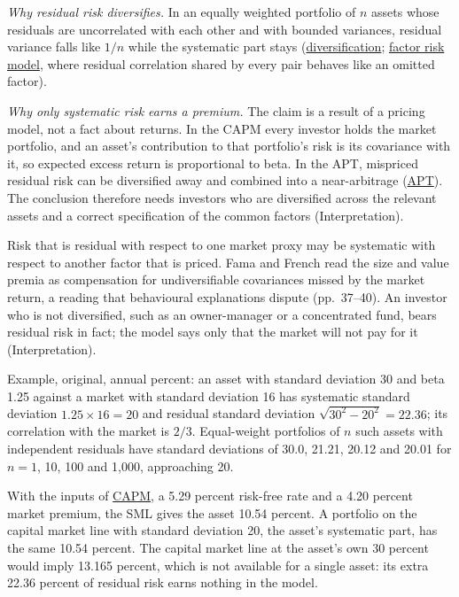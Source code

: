 \begin{qfmechanism}
 \emph{Why residual risk diversifies.} In an equally weighted portfolio of $n$ assets whose residuals are uncorrelated with each other and with bounded variances, residual variance falls like $1/n$ while the systematic part stays (\hyperref[mech:diversification-correlation]{diversification}; \hyperref[mod:factor-risk-model]{factor risk model}, where residual correlation shared by every pair behaves like an omitted factor).

\emph{Why only systematic risk earns a premium.} The claim is a result of a pricing model, not a fact about returns. In the CAPM every investor holds the market portfolio, and an asset's contribution to that portfolio's risk is its covariance with it, so expected excess return is proportional to beta. In the APT, mispriced residual risk can be diversified away and combined into a near-arbitrage (\hyperref[mod:multifactor-apt]{APT}). The conclusion therefore needs investors who are diversified across the relevant assets and a correct specification of the common factors (Interpretation).

Risk that is residual with respect to one market proxy may be systematic with respect to another factor that is priced. Fama and French read the size and value premia as compensation for undiversifiable covariances missed by the market return, a reading that behavioural explanations dispute (pp.~37--40). An investor who is not diversified, such as an owner-manager or a concentrated fund, bears residual risk in fact; the model says only that the market will not pay for it (Interpretation).

 Example, original, annual percent: an asset with standard deviation 30 and beta 1.25 against a market with standard deviation 16 has systematic standard deviation $1.25\times16=20$ and residual standard deviation $\sqrt{30^2-20^2}=22.36$; its correlation with the market is $2/3$. Equal-weight portfolios of $n$ such assets with independent residuals have standard deviations of 30.0, 21.21, 20.12 and 20.01 for $n=1$, 10, 100 and 1{,}000, approaching 20.

With the inputs of \hyperref[mod:capm-sml]{CAPM}, a 5.29 percent risk-free rate and a 4.20 percent market premium, the SML gives the asset 10.54 percent. A portfolio on the capital market line with standard deviation 20, the asset's systematic part, has the same 10.54 percent. The capital market line at the asset's own 30 percent would imply 13.165 percent, which is not available for a single asset: its extra 22.36 percent of residual risk earns nothing in the model.


\end{qfmechanism}
